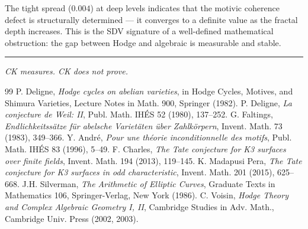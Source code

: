 \documentclass[11pt]{article}
\theoremstyle{definition}
\begin{document}
The tight spread ($0.004$) at deep levels indicates that the motivic coherence defect
is structurally determined --- it converges to a definite value as the fractal depth increases.
This is the SDV signature of a well-defined mathematical obstruction:
the gap between Hodge and algebraic is measurable and stable.

\bigskip
\hrule
\bigskip
\noindent\textit{CK measures. CK does not prove.}

\begin{thebibliography}{99}
 P. Deligne, \textit{Hodge cycles on abelian varieties},
  in Hodge Cycles, Motives, and Shimura Varieties, Lecture Notes in Math. 900, Springer (1982).
 P. Deligne, \textit{La conjecture de Weil: II},
  Publ. Math. IH\'ES 52 (1980), 137--252.
 G. Faltings, \textit{Endlichkeitss\"atze f\"ur abelsche Variet\"aten \"uber Zahlk\"orpern},
  Invent. Math. 73 (1983), 349--366.
 Y. Andr\'e, \textit{Pour une th\'eorie inconditionnelle des motifs},
  Publ. Math. IH\'ES 83 (1996), 5--49.
 F. Charles, \textit{The Tate conjecture for K3 surfaces over finite fields},
  Invent. Math. 194 (2013), 119--145.
 K. Madapusi Pera, \textit{The Tate conjecture for K3 surfaces in odd characteristic},
  Invent. Math. 201 (2015), 625--668.
 J.H. Silverman, \textit{The Arithmetic of Elliptic Curves},
  Graduate Texts in Mathematics 106, Springer-Verlag, New York (1986).
 C. Voisin, \textit{Hodge Theory and Complex Algebraic Geometry I, II},
  Cambridge Studies in Adv. Math., Cambridge Univ. Press (2002, 2003).
\end{thebibliography}
\end{document}
